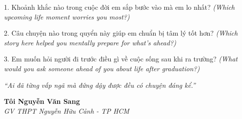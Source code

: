 \begin{tuhocnhanh}
1. Khoảnh khắc nào trong cuộc đời em sắp bước vào mà em lo nhất? \textit{(Which upcoming life moment worries you most?)}

2. Câu chuyện nào trong quyển này giúp em chuẩn bị tâm lý tốt hơn? \textit{(Which story here helped you mentally prepare for what's ahead?)}

3. Em muốn hỏi người đi trước điều gì về cuộc sống sau khi ra trường? \textit{(What would you ask someone ahead of you about life after graduation?)}
\end{tuhocnhanh}

\begin{center}
\textit{\color{truyengold}``Ai đã từng vấp ngã mà đứng dậy được đều có chuyện đáng kể.''}
\end{center}

\begin{flushright}
\textbf{Tôi Nguyễn Văn Sang}\\
\textit{GV THPT Nguyễn Hữu Cảnh - TP HCM}
\end{flushright}

\ngancach
